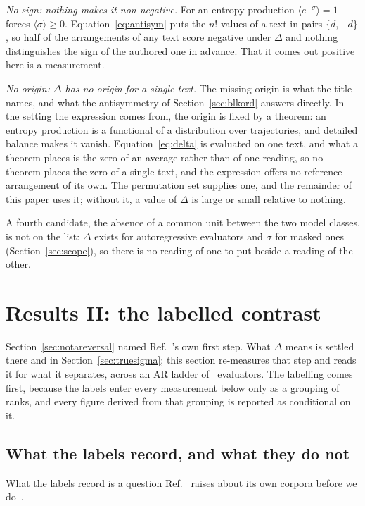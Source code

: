 \documentclass[11pt]{article}
\begin{document}
\emph{No sign: nothing makes it non-negative.}  For an entropy production
$\langle e^{-\sigma} \rangle = 1$ forces $\langle \sigma \rangle \geq 0$.
Equation~\eqref{eq:antisym} puts the $n!$ values of a text in pairs $\{d,
-d\}$, so half of the arrangements of any text score negative under
$\Delta$ and nothing distinguishes the sign of the authored one in advance.
That it comes out positive here is a measurement.

\emph{No origin: $\Delta$ has no origin for a single text.}  The missing origin is what the
title names, and what the antisymmetry of Section~\ref{sec:blkord} answers
directly.  In the setting
the expression comes from, the origin is fixed by a theorem: an entropy
production is a functional of a distribution over trajectories, and detailed
balance makes it vanish.  Equation~\eqref{eq:delta} is evaluated on one text,
and what a theorem places is the zero of an average rather than of one
reading, so no theorem places the zero of a single text, and the expression
offers no reference arrangement of its own.  The permutation set
supplies one, and the remainder of this paper uses it; without it,
a value of $\Delta$ is large or small relative to nothing.

A fourth candidate, the absence of a common unit between the two model
classes, is not on the list: $\Delta$ exists for autoregressive evaluators
and $\sigma$ for masked ones (Section~\ref{sec:scope}), so there is no
reading of one to put beside a reading of the other.


\section{Results II: the labelled contrast}
\label{sec:causal}

Section~\ref{sec:notareversal} named Ref.~\cite{sagawa2026}'s own first
step.  What $\Delta$ means is settled there and in
Section~\ref{sec:truesigma}; this section re-measures that step and reads it
for what it separates, across an AR ladder of \TrendNEval\ evaluators.  The labelling comes
first, because the labels enter every measurement below only as a grouping
of ranks, and every figure derived from that grouping is reported as
conditional on it.

\subsection{What the labels record, and what they do not}
\label{sec:construct}
What the labels record is a question Ref.~\cite{sagawa2026} raises about its
own corpora before we do~\cite[Sec.~V~B]{sagawa2026}.
\end{document}
